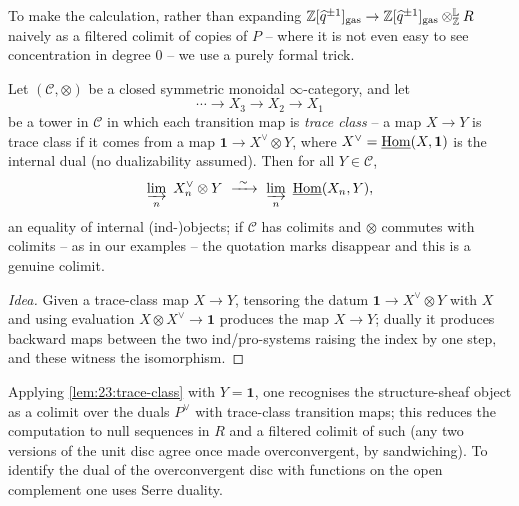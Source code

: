 To make the calculation, rather than expanding
$\mathbb Z[\widehat q^{\pm1}]_{\mathrm{gas}}\to\mathbb Z[\widehat q^{\pm1}]_{\mathrm{gas}}
\otimes^{\mathbb L}_{\mathbb Z}R$ naively as a filtered colimit of copies of
$P$ -- where it is not even easy to see concentration in degree $0$ -- we use a
purely formal trick.

\begin{lemma}
\label{lem:23:trace-class}
Let $(\mathcal C,\otimes)$ be a closed symmetric monoidal $\infty$-category, and
let
\begin{equation*}
\cdots\to X_3\to X_2\to X_1
\end{equation*}
be a tower in $\mathcal C$ in which each transition map is \emph{trace class} --
a map $X\to Y$ is trace class if it comes from a map
$\mathbf 1\to X^\vee\otimes Y$, where $X^\vee=\underline{\operatorname{Hom}}(X,\mathbf 1)$ is
the internal dual (no dualizability assumed). Then for all $Y\in\mathcal C$,
\begin{equation*}
\varinjlim_n\ X_n^\vee\otimes Y\ \xrightarrow{\ \sim\ }\
\varinjlim_n\ \underline{\Homop}(X_n,Y),
\end{equation*}
an equality of internal (ind-)objects; if $\mathcal C$ has colimits and $\otimes$
commutes with colimits -- as in our examples -- the quotation marks disappear
and this is a genuine colimit.
\end{lemma}

\begin{proof}[Idea]
Given a trace-class map $X\to Y$, tensoring the datum $\mathbf 1\to X^\vee\otimes
Y$ with $X$ and using evaluation $X\otimes X^\vee\to\mathbf 1$ produces the map
$X\to Y$; dually it produces backward maps between the two ind/pro-systems
raising the index by one step, and these witness the isomorphism.
\end{proof}

Applying \cref{lem:23:trace-class} with $Y=\mathbf 1$, one recognises the
structure-sheaf object as a colimit over the duals $P^\vee$ with trace-class
transition maps; this reduces the computation to null sequences in $R$ and a
filtered colimit of such (any two versions of the unit disc agree once made
overconvergent, by sandwiching). To identify the dual of the overconvergent disc
with functions on the open complement one uses Serre duality.

